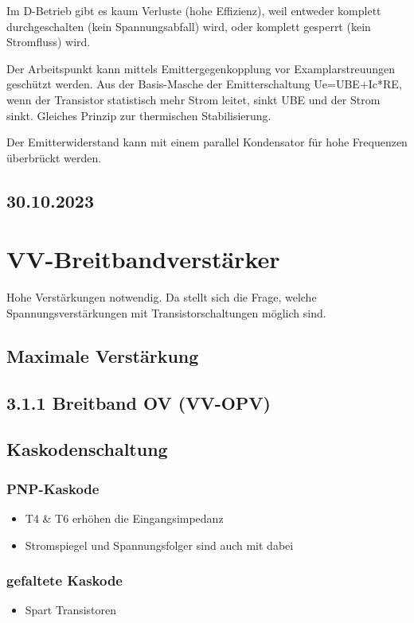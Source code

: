 \documentclass[a4paper]{article}
\begin{document}
\begin{itemize}
Im D-Betrieb gibt es kaum Verluste (hohe Effizienz), weil entweder komplett
durchgeschalten (kein Spannungsabfall) wird, oder komplett gesperrt (kein
Stromfluss) wird.

Der Arbeitspunkt kann mittels Emittergegenkopplung vor Examplarstreuungen
geschützt werden.
Aus der Basis-Masche der Emitterschaltung Ue=UBE+Ic*RE, wenn der 
Transistor statistisch mehr Strom leitet, sinkt UBE und der Strom sinkt.
Gleiches Prinzip zur thermischen Stabilisierung.

Der Emitterwiderstand kann mit einem parallel Kondensator für hohe Frequenzen
überbrückt werden.

\subsection*{30.10.2023}
\section*{VV-Breitbandverstärker}
Hohe Verstärkungen notwendig. Da stellt sich die Frage, welche Spannungsverstärkungen mit Transistorschaltungen möglich sind.

\subsection*{Maximale Verstärkung}

\subsection*{3.1.1 Breitband OV (VV-OPV)}

\subsection*{Kaskodenschaltung}
\subsubsection*{PNP-Kaskode}
\begin{itemize}
    \item T4 \& T6 erhöhen die Eingangsimpedanz
    \item Stromspiegel und Spannungsfolger sind auch mit dabei
\end{itemize}
\subsubsection*{gefaltete Kaskode}
\begin{itemize}
    \item Spart Transistoren
\end{itemize}


\end{itemize}
\end{document}
